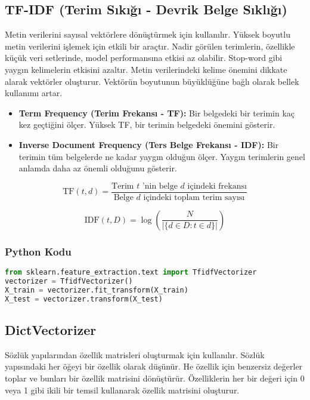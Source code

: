 \newpage

\subsection{TF-IDF (Terim Sıkığı - Devrik Belge Sıklığı)}
Metin verilerini sayısal vektörlere dönüştürmek için kullanılır. Yüksek boyutlu metin verilerini işlemek için etkili bir araçtır. Nadir görülen terimlerin, özellikle küçük veri setlerinde, model performansına etkisi az olabilir. Stop-word gibi yaygın kelimelerin etkisini azaltır. Metin verilerindeki kelime önemini dikkate alarak vektörler oluşturur. Vektörün boyutunun büyüklüğüne bağlı olarak bellek kullanımı artar.

\begin{itemize}
    \item \textbf{Term Frequency (Terim Frekansı - TF):} Bir belgedeki bir terimin kaç kez geçtiğini ölçer. Yüksek TF, bir terimin belgedeki önemini gösterir.
    \item \textbf{Inverse Document Frequency (Ters Belge Frekansı - IDF):} Bir terimin tüm belgelerde ne kadar yaygın olduğun ölçer. Yaygın terimlerin genel anlamda daha az önemli olduğunu gösterir.
\end{itemize}

\[\text{TF}(t, d) = \frac{\text{Terim } t \text{ 'nin belge } d \text{ içindeki frekansı}}{\text{Belge } d \text{ içindeki toplam terim sayısı}}\]

\[\text{IDF}(t, D) = \log\left(\frac{N}{|\{d \in D : t \in d\}|}\right) \]

\subsubsection{Python Kodu}

\begin{lstlisting}[language=Python]
from sklearn.feature_extraction.text import TfidfVectorizer
vectorizer = TfidfVectorizer()
X_train = vectorizer.fit_transform(X_train)
X_test = vectorizer.transform(X_test)
\end{lstlisting}

\newpage

\subsection{DictVectorizer}
Sözlük yapılarından özellik matrisleri oluşturmak için kullanılır. Sözlük yapısındaki her öğeyi bir özellik olarak düşünür. He özellik için benzersiz değerler toplar ve bunları bir özellik matrisini dönüştürür. Özelliklerin her bir değeri için 0 veya 1 gibi ikili bir temsil kullanarak özellik matrisini oluşturur.

